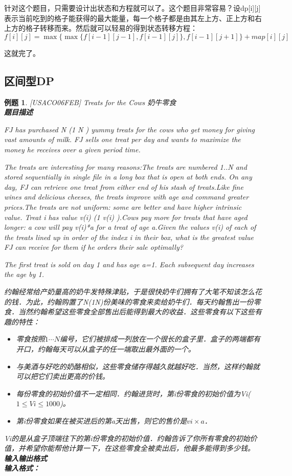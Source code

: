 \documentclass{article}
\newtheorem{example}{例题}[subsection]
\theoremstyle{nonumberplain}
\begin{document}
针对这个题目，只需要设计出状态和方程就可以了。这个题目非常容易？设dp[i][j]表示当前吃到的格子能获得的最大能量，每一个格子都是由其左上方、正上方和右上方的格子转移而来。然后就可以轻易的得到状态转移方程：
\begin{equation*}f[i][j] = \max\{\max\{f[i-1][j-1],f[i-1][j]\},f[i-1][j+1]\} + map[i][j]\end{equation*}

这就完了。
\subsection{区间型DP}
\begin{example}{[USACO06FEB] Treats for the Cows 奶牛零食}\\
	\textbf{题目描述}

	FJ has purchased N (1 \leq N ) yummy treats for the cows who get money for giving vast amounts of milk. FJ sells one treat per day and wants to maximize the money he receives over a given period time.

	The treats are interesting for many reasons:The treats are numbered 1..N and stored sequentially in single file in a long box that is open at both ends. On any day, FJ can retrieve one treat from either end of his stash of treats.Like fine wines and delicious cheeses, the treats improve with age and command greater prices.The treats are not uniform: some are better and have higher intrinsic value. Treat i has value v(i) (1 \leq v(i) ).Cows pay more for treats that have aged longer: a cow will pay v(i)*a for a treat of age a.Given the values v(i) of each of the treats lined up in order of the index i in their box, what is the greatest value FJ can receive for them if he orders their sale optimally?

	The first treat is sold on day 1 and has age a=1. Each subsequent day increases the age by 1.

	约翰经常给产奶量高的奶牛发特殊津贴，于是很快奶牛们拥有了大笔不知该怎么花的钱．为此，约翰购置了N(1\leq N)份美味的零食来卖给奶牛们．每天约翰售出一份零食．当然约翰希望这些零食全部售出后能得到最大的收益．这些零食有以下这些有趣的特性：

	\begin{itemize}
		\item{零食按照$1\cdots N$编号，它们被排成一列放在一个很长的盒子里．盒子的两端都有开口，约翰每天可以从盒子的任一端取出最外面的一个。}
		\item{与美酒与好吃的奶酪相似，这些零食储存得越久就越好吃．当然，这样约翰就可以把它们卖出更高的价钱。}
		\item{每份零食的初始价值不一定相同．约翰进货时，第i份零食的初始价值为Vi($1\leq Vi\leq 1000$)。}
		\item{第i份零食如果在被买进后的第a天出售，则它的售价是$vi\times a$．}
	\end{itemize}
	Vi的是从盒子顶端往下的第i份零食的初始价值．约翰告诉了你所有零食的初始价值，并希望你能帮他计算一下，在这些零食全被卖出后，他最多能得到多少钱。\ \\
	\textbf{输入输出格式}\\
	\textbf{输入格式：}


\end{example}
\end{document}
